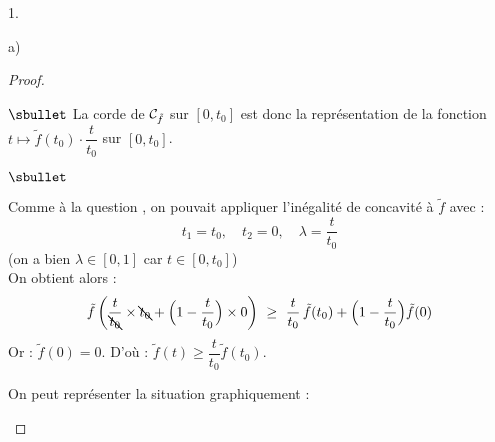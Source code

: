 \documentclass[11pt]{article}%
\begin{document}
\begin{noliste}{1.}
\begin{noliste}{a)}
\begin{proof}
\begin{noliste}{$\sbullet$}
      La corde de ${\cal C}_{\tilde{f}}$ sur $[0,t_0]$ est donc la 
      représentation 
      de la 
      fonction $t\mapsto \tilde{f}(t_0)\cdot \dfrac{t}{t_0}$
      sur $[0,t_0]$.
    \end{noliste}
    
    
    
    
    \newpage
    
    
    
    \begin{remark}
     \begin{noliste}{$\sbullet$}
      \item Comme à la question , on pouvait
      appliquer 
      l'inégalité de concavité à $\tilde{f}$ avec :
      \[
        t_1 = t_0, \quad t_2 = 0, \quad \lambda = \dfrac{t}{t_0}
      \]
      (on a bien $\lambda \in [0,1]$ car $t\in [0,t_0]$)\\
      On obtient alors :
	\[
	  \tilde{f}\left(\dfrac{t}{\bcancel{t_0}}\times \bcancel{t_0} + 
	  \Big(1- \dfrac{t}{t_0}\Big) \times 0\right) \ \geq \ 
	  \dfrac{t}{t_0} \, \tilde{f}(t_0) + \Big(1-\dfrac{t}{t_0}\Big) 
	  \tilde{f}(0)
	\]
	Or : $\tilde{f}(0)=0$. 
	D'où :
	$
	  \tilde{f}(t) \geq \dfrac{t}{t_0} \tilde{f}(t_0).
	$
      
      \item On peut représenter la situation graphiquement :
      

\end{noliste}
\end{remark}
\end{proof}
\end{noliste}
\end{noliste}
\end{document}
